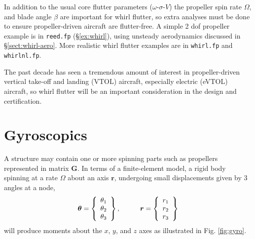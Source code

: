 \documentclass[10pt,openany,twoside]{book}
\numberwithin{equation}{section}   %
\newcommand{\Code}[1]{{\small\tt #1}}
\newcommand{\Matrix}[1]{\boldsymbol{#1}}
\newcommand{\Vector}[1]{\boldsymbol{#1}}
\newcommand{\Sectref}[1]{\S\ref{#1}}
\newcommand{\Figref}[1]{Fig. \ref{#1}}
\newcommand{\OSV}{$\omega$-$\sigma$-$V$\:}               %
\begin{document}
In addition to the usual core flutter parameters (\OSV) the propeller spin rate
$\Omega$, and blade angle $\beta$ 
are important for whirl flutter, so extra analyses must be done to
ensure propeller-driven aircraft are flutter-free.  A simple 2 dof
propeller example is in \Code{reed.fp}
(\Sectref{ex:whirl}), using unsteady aerodynamics discussed in \Sectref{sect:whirl-aero}.
More realistic whirl flutter examples are in \Code{whirl.fp} and
\Code{whirlnl.fp}.

The past decade has seen a tremendous amount of interest in
propeller-driven vertical take-off and landing (VTOL) aircraft,
especially electric (eVTOL) aircraft, so whirl flutter
will be an important consideration in the design and certification.

\section{Gyroscopics}
A structure may contain one or more spinning parts such as propellers
represented in matrix $\Matrix{G}$. In terms of a finite-element model,
a rigid body spinning at a rate $\Omega$ about an axis $\Vector{r}$,
undergoing small displacements given by 3 angles at a node,
\begin{equation}
\Vector{\theta} = \left\{ \begin{array}{c}
			\theta_{1} \\
	      \theta_2 \\
			\theta_3
		\end{array} \right\},		\nonumber
	\hspace{10mm}
\Vector{r} = \left\{ \begin{array}{c}
			r_{1} \\
	      r_2 \\
			r_3
		\end{array} \right\}		\nonumber
\end{equation}
will produce moments
about the $x$, $y$, and $z$ axes as illustrated in \Figref{fig:gyro}.
\end{document}
